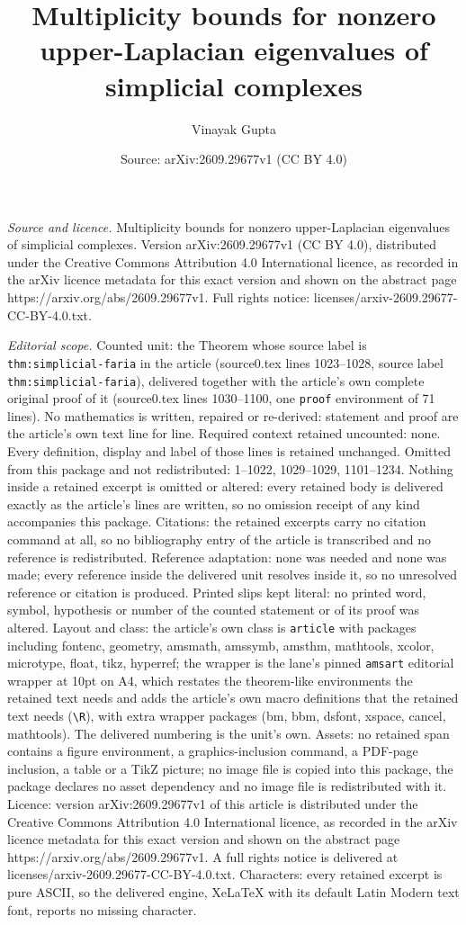 \documentclass[10pt,a4paper]{amsart}
\title[Multiplicity bounds for nonzero upper-Laplacian eigenvalues ]{Multiplicity bounds for nonzero upper-Laplacian eigenvalues of simplicial complexes}
\author{Vinayak Gupta}
\date{Source: arXiv:2609.29677v1 (CC BY 4.0)}
\begin{document}
\maketitle

\noindent\emph{Source and licence.} Multiplicity bounds for nonzero upper-Laplacian eigenvalues of simplicial complexes. Version arXiv:2609.29677v1 (CC BY 4.0), distributed under the Creative Commons Attribution 4.0 International licence, as recorded in the arXiv licence metadata for this exact version and shown on the abstract page https://arxiv.org/abs/2609.29677v1. Full rights notice: licenses/arxiv-2609.29677-CC-BY-4.0.txt.\par\smallskip

\noindent\textit{Editorial scope.} Counted unit: the Theorem whose source label is \texttt{thm:simplicial-faria} in the article (source0.tex lines 1023--1028, source label \texttt{thm:simplicial-faria}), delivered together with the article's own complete original proof of it (source0.tex lines 1030--1100, one \texttt{proof} environment of 71 lines). No mathematics is written, repaired or re-derived: statement and proof are the article's own text line for line. Required context retained uncounted: none. Every definition, display and label of those lines is retained unchanged. Omitted from this package and not redistributed: 1--1022, 1029--1029, 1101--1234. Nothing inside a retained excerpt is omitted or altered: every retained body is delivered exactly as the article's lines are written, so no omission receipt of any kind accompanies this package. Citations: the retained excerpts carry no citation command at all, so no bibliography entry of the article is transcribed and no reference is redistributed. Reference adaptation: none was needed and none was made; every reference inside the delivered unit resolves inside it, so no unresolved reference or citation is produced. Printed slips kept literal: no printed word, symbol, hypothesis or number of the counted statement or of its proof was altered. Layout and class: the article's own class is \texttt{article} with packages including fontenc, geometry, amsmath, amssymb, amsthm, mathtools, xcolor, microtype, float, tikz, hyperref; the wrapper is the lane's pinned \texttt{amsart} editorial wrapper at 10pt on A4, which restates the theorem-like environments the retained text needs and adds the article's own macro definitions that the retained text needs (\texttt{\textbackslash R}), with extra wrapper packages (bm, bbm, dsfont, xspace, cancel, mathtools). The delivered numbering is the unit's own. Assets: no retained span contains a figure environment, a graphics-inclusion command, a PDF-page inclusion, a table or a TikZ picture; no image file is copied into this package, the package declares no asset dependency and no image file is redistributed with it. Licence: version arXiv:2609.29677v1 of this article is distributed under the Creative Commons Attribution 4.0 International licence, as recorded in the arXiv licence metadata for this exact version and shown on the abstract page https://arxiv.org/abs/2609.29677v1. A full rights notice is delivered at licenses/arxiv-2609.29677-CC-BY-4.0.txt. Characters: every retained excerpt is pure ASCII, so the delivered engine, XeLaTeX with its default Latin Modern text font, reports no missing character.
\end{document}
